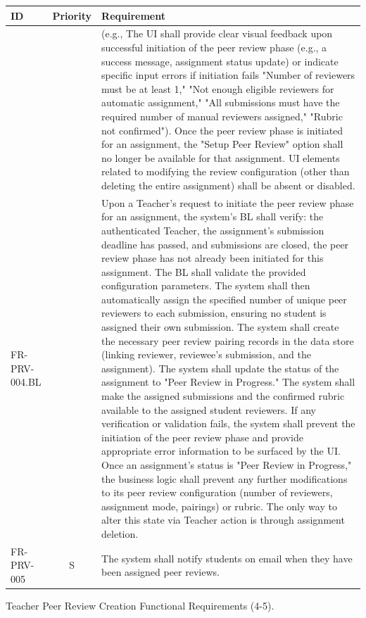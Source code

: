 \clearpage
\begin{longtable}{|l|c|p{10cm}|}
    \hline
    \textbf{ID} & \textbf{Priority} & \textbf{Requirement} \\
    \hline
     &  & (e.g., The UI shall provide clear visual feedback upon successful initiation of the peer review phase (e.g., a success message, assignment status update) or indicate specific input errors if initiation fails "Number of reviewers must be at least 1," "Not enough eligible reviewers for automatic assignment," "All submissions must have the required number of manual reviewers assigned," "Rubric not confirmed"). Once the peer review phase is initiated for an assignment, the "Setup Peer Review" option shall no longer be available for that assignment. UI elements related to modifying the review configuration (other than deleting the entire assignment) shall be absent or disabled. \\
    \quad FR-PRV-004.BL &  & \quad Upon a Teacher's request to initiate the peer review phase for an assignment, the system's BL shall verify: the authenticated Teacher, the assignment's submission deadline has passed, and submissions are closed, the peer review phase has not already been initiated for this assignment. The BL shall validate the provided configuration parameters. The system shall then automatically assign the specified number of unique peer reviewers to each submission, ensuring no student is assigned their own submission. The system shall create the necessary peer review pairing records in the data store (linking reviewer, reviewee's submission, and the assignment). The system shall update the status of the assignment to "Peer Review in Progress." The system shall make the assigned submissions and the confirmed rubric available to the assigned student reviewers. If any verification or validation fails, the system shall prevent the initiation of the peer review phase and provide appropriate error information to be surfaced by the UI. Once an assignment's status is "Peer Review in Progress," the business logic shall prevent any further modifications to its peer review configuration (number of reviewers, assignment mode, pairings) or rubric. The only way to alter this state via Teacher action is through assignment deletion. \\
    \hline
    FR-PRV-005 & S & The system shall notify students on email when they have been assigned peer reviews. \\
    \hline
\end{longtable}
\begin{table}[h]
    \centering
    \caption{Teacher Peer Review Creation Functional Requirements (4-5).}
    \label{tab:TeacherPeerReviewFR5}
\end{table}

